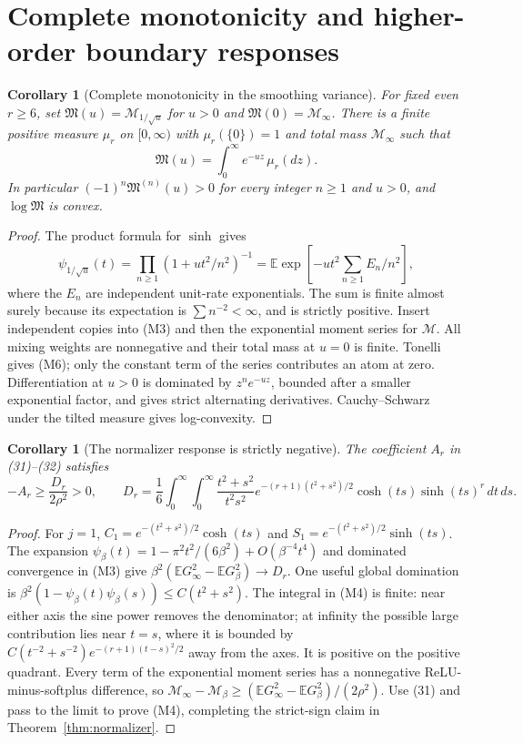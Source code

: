\documentclass[11pt]{article}
\newtheorem{corollary}[theorem]{Corollary}
\newcommand{\E}{\mathbb E}\newcommand{\R}{\mathbb R}
\begin{document}
\section{Complete monotonicity and higher-order boundary responses}
\begin{corollary}[Complete monotonicity in the smoothing variance]
For fixed even $r\ge6$, set $\mathfrak M(u)=\mathcal M_{1/\sqrt u}$
for $u>0$ and $\mathfrak M(0)=\mathcal M_\infty$.
There is a finite positive measure $\mu_r$ on $[0,\infty)$ with
$\mu_r(\{0\})=1$ and total mass $\mathcal M_\infty$ such that
\[
             \mathfrak M(u)=\int_0^\infty e^{-u z}\,\mu_r(dz).
                                                               \tag{M6}
\]
In particular $(-1)^n\mathfrak M^{(n)}(u)>0$ for every integer
$n\ge1$ and $u>0$, and $\log\mathfrak M$ is convex.
\end{corollary}
\begin{proof}
The product formula for $\sinh$ gives
\[
 \psi_{1/\sqrt u}(t)=\prod_{n\ge1}(1+ut^2/n^2)^{-1}
       =\E\exp\left[-ut^2\sum_{n\ge1}E_n/n^2\right],
\]
where the $E_n$ are independent unit-rate exponentials.
The sum is finite almost surely because its expectation is
$\sum n^{-2}<\infty$, and is strictly positive.
Insert independent copies into (M3) and then the exponential moment
series for $\mathcal M$. All mixing weights are nonnegative and their
total mass at $u=0$ is finite. Tonelli gives (M6); only the constant
term of the series contributes an atom at zero. Differentiation at
$u>0$ is dominated by $z^ne^{-uz}$, bounded after a smaller exponential
factor, and gives strict alternating derivatives.
Cauchy--Schwarz under the tilted measure gives log-convexity.
\end{proof}

\begin{corollary}[The normalizer response is strictly negative]
The coefficient $A_r$ in (31)--(32) satisfies
\[
 -A_r\ge\frac{D_r}{2\rho^2}>0,\qquad
 D_r=\frac16\int_0^\infty\!\int_0^\infty
 \frac{t^2+s^2}{t^2s^2}
 e^{-(r+1)(t^2+s^2)/2}\cosh(ts)\sinh(ts)^r\,dt\,ds.
                                                               \tag{M4}
\]
\end{corollary}
\begin{proof}
For $j=1$,
$C_1=e^{-(t^2+s^2)/2}\cosh(ts)$ and
$S_1=e^{-(t^2+s^2)/2}\sinh(ts)$.
The expansion $\psi_\beta(t)=1-\pi^2t^2/(6\beta^2)+O(\beta^{-4}t^4)$
and dominated convergence in (M3) give
$\beta^2(\E G_\infty^2-\E G_\beta^2)\to D_r$.
One useful global domination is
$\beta^2(1-\psi_\beta(t)\psi_\beta(s))\le C(t^2+s^2)$.
The integral in (M4) is finite: near either axis the sine power
removes the denominator; at infinity the possible large contribution
lies near $t=s$, where it is bounded by
$C(t^{-2}+s^{-2})e^{-(r+1)(t-s)^2/2}$ away from the axes.
It is positive on the positive quadrant.
Every term of the exponential moment series has a nonnegative
ReLU-minus-softplus difference, so
$\mathcal M_\infty-\mathcal M_\beta
\ge(\E G_\infty^2-\E G_\beta^2)/(2\rho^2)$.
Use (31) and pass to the limit to prove (M4), completing the strict-sign
claim in Theorem~\ref{thm:normalizer}.
\end{proof}
\end{document}
